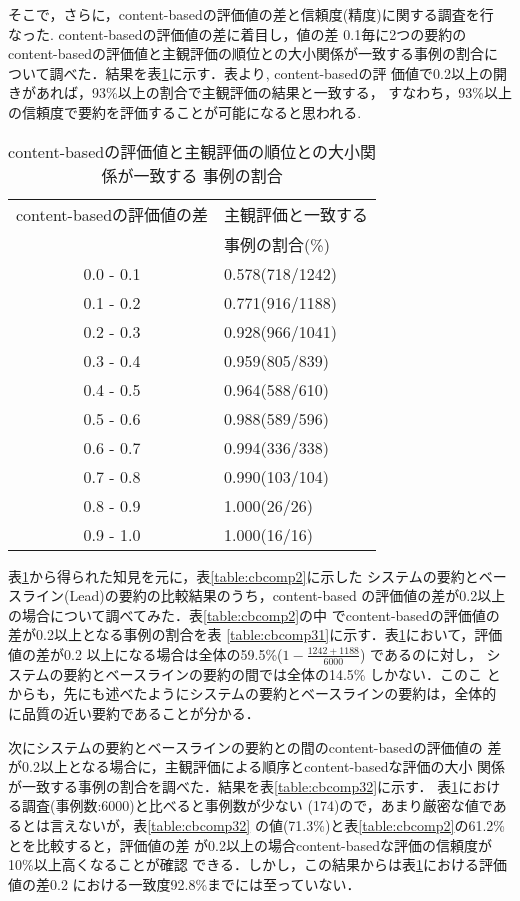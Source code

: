 そこで，さらに，content-basedの評価値の差と信頼度(精度)に関する調査を行
なった.  content-basedの評価値の差に着目し，値の差 0.1毎に2つの要約の
content-basedの評価値と主観評価の順位との大小関係が一致する事例の割合に
ついて調べた．結果を表\ref{table:cb0.1}に示す．表より, content-basedの評
価値で0.2以上の開きがあれば，93\%以上の割合で主観評価の結果と一致する，
すなわち，93\%以上の信頼度で要約を評価することが可能になると思われる.

\begin{table}[t]
\caption{content-basedの評価値と主観評価の順位との大小関係が一致する
事例の割合\label{table:cb0.1}}
\begin{center}
\begin{tabular}{|c|l|}\hline
content-basedの評価値の差 & 主観評価と一致する\\ 
             & 事例の割合(\%)\\ \hline\hline
0.0 - 0.1 & 0.578(718/1242)\\ \hline
0.1 - 0.2 & 0.771(916/1188)\\ \hline
0.2 - 0.3 & 0.928(966/1041)\\ \hline
0.3 - 0.4 & 0.959(805/839)\\ \hline
0.4 - 0.5 & 0.964(588/610)\\ \hline
0.5 - 0.6 & 0.988(589/596)\\ \hline
0.6 - 0.7 & 0.994(336/338)\\ \hline
0.7 - 0.8 & 0.990(103/104)\\ \hline
0.8 - 0.9 & 1.000(26/26)\\ \hline
0.9 - 1.0 & 1.000(16/16)\\ \hline
\end{tabular}
\end{center}
\end{table}

表\ref{table:cb0.1}から得られた知見を元に，表\ref{table:cbcomp2}に示した
システムの要約とベースライン(Lead)の要約の比較結果のうち，content-based
の評価値の差が0.2以上の場合について調べてみた．表\ref{table:cbcomp2}の中
でcontent-basedの評価値の差が0.2以上となる事例の割合を表
\ref{table:cbcomp31}に示す．表\ref{table:cb0.1}において，評価値の差が0.2
以上になる場合は全体の59.5\%($1-\frac{1242+1188}{6000}$) であるのに対し，
システムの要約とベースラインの要約の間では全体の14.5\% しかない．このこ
とからも，先にも述べたようにシステムの要約とベースラインの要約は，全体的
に品質の近い要約であることが分かる．

次にシステムの要約とベースラインの要約との間のcontent-basedの評価値の
差が0.2以上となる場合に，主観評価による順序とcontent-basedな評価の大小
関係が一致する事例の割合を調べた．結果を表\ref{table:cbcomp32}に示す．
表\ref{table:cb0.1}における調査(事例数:6000)と比べると事例数が少ない
(174)ので，あまり厳密な値であるとは言えないが，表\ref{table:cbcomp32}
の値(71.3\%)と表\ref{table:cbcomp2}の61.2\%とを比較すると，評価値の差
が0.2以上の場合content-basedな評価の信頼度が10\%以上高くなることが確認
できる．しかし，この結果からは表\ref{table:cb0.1}における評価値の差0.2
における一致度92.8\%までには至っていない．


